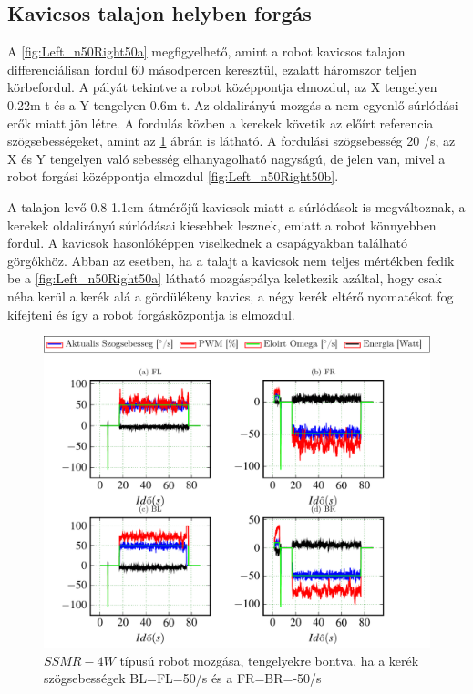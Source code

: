 \subsection{Kavicsos talajon helyben forgás}
A \ref{fig:Left_n50Right50a} megfigyelhető, amint a robot kavicsos talajon differenciálisan fordul 60 másodpercen keresztül, ezalatt háromszor teljen körbefordul. A pályát tekintve a robot középpontja elmozdul, az X tengelyen 0.22m-t és a Y tengelyen 0.6m-t.  Az oldalirányú mozgás a nem egyenlő súrlódási erők miatt jön létre.
A fordulás közben a kerekek követik az előírt referencia szögsebességeket, amint az \ref{fig:Left_n50Right50x} ábrán is látható.
A fordulási szögsebesség 20 \degree/s, az X és Y tengelyen való sebesség elhanyagolható nagyságú, de jelen van, mivel a robot forgási középpontja elmozdul \ref{fig:Left_n50Right50b}.

A talajon levő 0.8-1.1cm átmérőjű kavicsok miatt a súrlódások is megváltoznak, a kerekek oldalirányú súrlódásai kiesebbek lesznek, emiatt a robot könnyebben fordul. A kavicsok hasonlóképpen viselkednek a csapágyakban található görgőkhöz.
Abban az esetben, ha a talajt a kavicsok nem teljes mértékben fedik be a \ref{fig:Left_n50Right50a} látható mozgáspálya keletkezik azáltal, hogy csak néha kerül a kerék alá a gördülékeny kavics, a négy kerék eltérő nyomatékot fog kifejteni és így a robot forgásközpontja is elmozdul.

\renewcommand{\nth}{2}
\renewcommand{\GlobalPath}{Meresek/Mozgasok/NormalMukodes/DiferencialisanHelybeKavicsos/}
\renewcommand{\secondImage}{*}



\begin{figure}[H]
  \includegraphics{tikz/Left_n50Right50x.pdf}
  \caption{$SSMR-4W$ típusú robot mozgása, tengelyekre bontva, ha a kerék szögsebességek BL=FL=50\degree/s és a FR=BR=-50\degree/s}
  \label{fig:Left_n50Right50x}
\end{figure}


